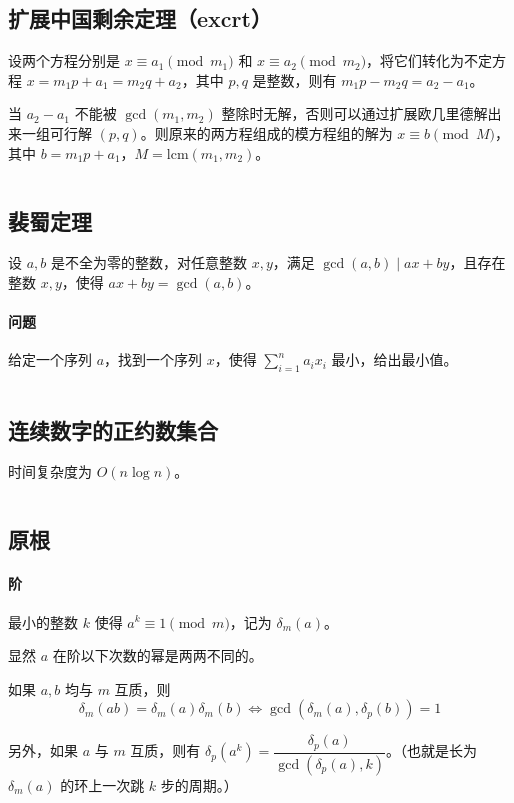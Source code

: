 \documentclass[a4paper, twoside]{article}
\begin{document}
\subsection{扩展中国剩余定理（excrt）}
设两个方程分别是 $x\equiv a_1 \pmod {m_1}$ 和 $x\equiv a_2 \pmod {m_2}$，将它们转化为不定方程 $x = m_1 p + a_1 = m_2 q + a_2$，其中 $p, q$ 是整数，则有 $m_1 p - m_2 q = a_2 - a_1$。

当 $a_2 - a_1$ 不能被 $\gcd(m_1, m_2)$ 整除时无解，否则可以通过扩展欧几里德解出来一组可行解 $(p, q)$。则原来的两方程组成的模方程组的解为 $x\equiv b\pmod M$，其中 $b = m_1 p + a_1$，$M = \text{lcm}(m_1, m_2)$。
\inputminted{cpp}{../src/数论/扩展中国剩余定理（excrt）.cpp}

\subsection{裴蜀定理}
设 $a, b$ 是不全为零的整数，对任意整数 $x, y$，满足 $\gcd(a,b) \mid ax + by$，且存在整数 $x,y$，使得 $ax+by = \gcd(a,b)$。

\paragraph{问题} 给定一个序列 $a$，找到一个序列 $x$，使得 $\sum\limits_{i=1}^{n}a_{i}x_{i}$ 最小，给出最小值。
\inputminted{cpp}{../src/数论/裴蜀定理.cpp}

\subsection{连续数字的正约数集合}
时间复杂度为 $O(n\log n)$。
\inputminted{cpp}{../src/数论/连续数字的正约数集合.cpp}

\subsection{原根}
\paragraph{阶} 最小的整数 $k$ 使得 $a ^ k \equiv 1 \pmod m$，记为 $\delta_m(a)$。

显然 $a$ 在阶以下次数的幂是两两不同的。

如果 $a, b$ 均与 $m$ 互质，则
$$\delta_m(ab)=\delta_m(a)\delta_m(b) \iff \gcd\left(\delta_m(a),\delta_p(b)\right) = 1$$

另外，如果 $a$ 与 $m$ 互质，则有 $\delta_p(a^k)=\dfrac{\delta_p(a)}{\gcd\left(\delta_p(a),k\right)}$。（也就是长为 $\delta_m(a)$ 的环上一次跳 $k$ 步的周期。）
\end{document}
